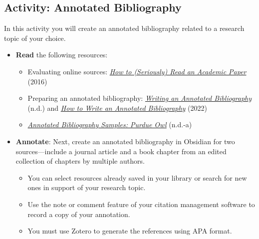 \documentclass[
  letterpaper,
  DIV=11,
  numbers=noendperiod]{scrreprt}
\providecommand{\tightlist}{%
  \setlength{\itemsep}{0pt}\setlength{\parskip}{0pt}}\usepackage{longtable,booktabs,array}
\begin{document}
\subsection{Activity: Annotated
Bibliography}\label{activity-annotated-bibliography}

\begin{tcolorbox}[enhanced jigsaw, toprule=.15mm, colback=white, colframe=quarto-callout-note-color-frame, bottomtitle=1mm, leftrule=.75mm, coltitle=black, titlerule=0mm, rightrule=.15mm, colbacktitle=quarto-callout-note-color!10!white, left=2mm, title={Learning Activity}, opacitybacktitle=0.6, opacityback=0, breakable, toptitle=1mm, arc=.35mm, bottomrule=.15mm]

In this activity you will create an annotated bibliography related to a
research topic of your choice.

\begin{itemize}
\tightlist
\item
  \textbf{Read} the following resources:

  \begin{itemize}
  \tightlist
  \item
    Evaluating online sources:
    \href{https://www.science.org/content/article/how-seriously-read-scientific-paper?v=sy9PVZAbSAQ}{\emph{How
    to (Seriously) Read an Academic Paper}} (2016)
  \item
    Preparing an annotated bibliography:
    \href{https://library.concordia.ca/help/writing/annotated-bibliography.php}{\emph{Writing
    an Annotated Bibliography}} (n.d.) and
    \emph{\href{https://library.concordia.ca/help/writing/annotated-bibliography.php\#:~:text=In\%20an\%20annotated\%20bibliography\%2C\%20each,relevance\%20to\%20your\%20paper\%20topic.}{How
    to Write an Annotated Bibliography}} (2022)
  \item
    \emph{\href{https://owl.purdue.edu/owl/general_writing/common_writing_assignments/annotated_bibliographies/annotated_bibliography_samples.html}{Annotated
    Bibliography Samples: Purdue Owl}} (n.d.-a)
  \end{itemize}
\item
  \textbf{Annotate}: Next, create an annotated bibliography in Obsidian
  for two sources---include a journal article and a book chapter from an
  edited collection of chapters by multiple authors.

  \begin{itemize}
  \tightlist
  \item
    You can select resources already saved in your library or search for
    new ones in support of your research topic.
  \item
    Use the note or comment feature of your citation management software
    to record a copy of your annotation.
  \item
    You must use Zotero to generate the references using APA format.
  \end{itemize}
\end{itemize}

\end{tcolorbox}
\end{document}
